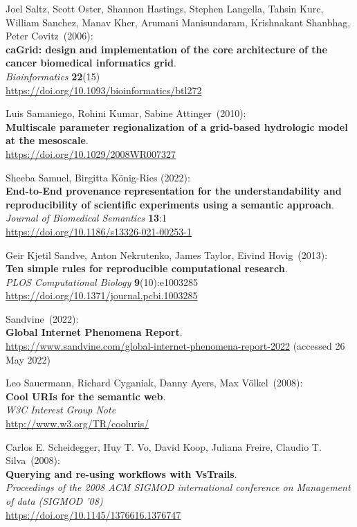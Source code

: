 \begin{thebibliography}{9}
Joel Saltz, Scott Oster, Shannon Hastings, Stephen Langella, Tahsin Kurc, William Sanchez, Manav Kher, Arumani Manisundaram, Krishnakant Shanbhag, Peter Covitz~(2006): \\
\textbf{caGrid: design and implementation of the core architecture of the cancer biomedical informatics grid}.\\
\emph{Bioinformatics}
\textbf{22}(15) \\
\url{https://doi.org/10.1093/bioinformatics/btl272}

Luis Samaniego, Rohini Kumar, Sabine Attinger~(2010): \\
\textbf{Multiscale parameter regionalization of a grid-based hydrologic model at the mesoscale}.\\
\url{https://doi.org/10.1029/2008WR007327}

 Sheeba Samuel, Birgitta König-Ries (2022): \\
\textbf{End-to-End provenance representation for the understandability and reproducibility of scientific experiments using a semantic approach}. \\
\emph{Journal of Biomedical Semantics} \textbf{13}:1 \\
\url{https://doi.org/10.1186/s13326-021-00253-1}

Geir Kjetil Sandve, Anton Nekrutenko, James Taylor, Eivind Hovig~(2013): \\
\textbf{Ten simple rules for reproducible computational research}.\\
\emph{PLOS Computational Biology} \textbf{9}(10):e1003285\\
\url{https://doi.org/10.1371/journal.pcbi.1003285}

Sandvine~(2022): \\
\textbf{Global Internet Phenomena Report}.\\
\url{https://www.sandvine.com/global-internet-phenomena-report-2022}
(accessed 26 May 2022)

Leo Sauermann, Richard Cyganiak, Danny Ayers, Max Völkel~(2008): \\
\textbf{Cool URIs for the semantic web}.\\
\emph{W3C Interest Group Note}\\
\url{http://www.w3.org/TR/cooluris/}

Carlos E. Scheidegger, Huy T. Vo, David Koop, Juliana Freire, Claudio T. Silva~(2008): \\
\textbf{Querying and re-using workflows with VsTrails}. \\
\emph{Proceedings of the 2008 ACM SIGMOD international conference on Management of data (SIGMOD '08)}\\
\url{https://doi.org/10.1145/1376616.1376747}


\end{thebibliography}
